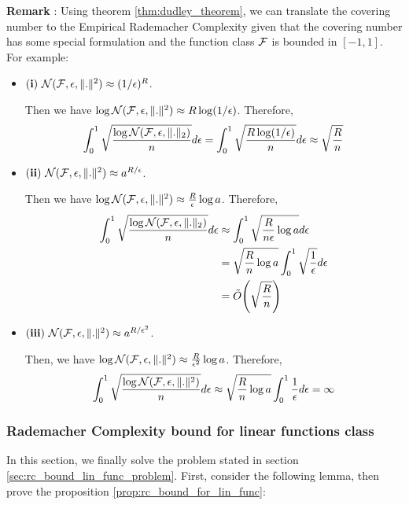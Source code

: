\noindent\newline\textbf{Remark} : Using theorem \ref{thm:dudley_theorem}, we can translate the covering number to the Empirical Rademacher Complexity given that the covering number has some special formulation and the function class $\mathcal{F}$ is bounded in $[-1, 1]$. For example:
\begin{itemize}
    \item ${\bf (i)} \ \mathcal{N}(\mathcal{F}, \epsilon, \|.\|^2) \approx (1/\epsilon)^R$.

    \noindent Then we have $\log\mathcal{N}(\mathcal{F}, \epsilon, \|.\|^2) \approx R\log(1/\epsilon)$. Therefore,
    \begin{align*}
        \int_0^1 \sqrt{
            \frac{\log \mathcal{N}(\mathcal{F}, \epsilon, \|.\|_2)}{n}
        }d\epsilon = \int_0^1\sqrt{
            \frac{R\log(1/\epsilon)}{n}
        }d\epsilon \approx \sqrt{\frac{R}{n}}
    \end{align*}

    \item ${\bf (ii)} \ \mathcal{N}(\mathcal{F}, \epsilon, \|.\|^2) \approx a^{R/\epsilon}$.

    \noindent Then we have $\log\mathcal{N}(\mathcal{F}, \epsilon, \|.\|^2) \approx \frac{R}{\epsilon}\log a$. Therefore,
    \begin{align*}
        \int_0^1 \sqrt{
            \frac{\log \mathcal{N}(\mathcal{F}, \epsilon, \|.\|_2)}{n}
        }d\epsilon &\approx \int_0^1\sqrt{
            \frac{R}{n\epsilon}\log a 
        }d\epsilon \\
        &= \sqrt{
            \frac{R}{n}\log a 
        }\int_0^1 \sqrt{\frac{1}{\epsilon}}d\epsilon \\
        &= \tilde O\Bigg(  \sqrt{\frac{R}{n}}  \Bigg)
    \end{align*}

    \item ${\bf (iii)} \ \mathcal{N}(\mathcal{F}, \epsilon, \|.\|^2) \approx a^{R/\epsilon^2}$.
    
    \noindent Then, we have $\log \mathcal{N}(\mathcal{F}, \epsilon, \|.\|^2)\approx \frac{R}{\epsilon^2}\log a$. Therefore,
    \begin{align*}
        \int_0^1 \sqrt{
            \frac{\log \mathcal{N}(\mathcal{F}, \epsilon, \|.\|^2)}{n}
        }d\epsilon \approx \sqrt{
            \frac{R}{n}\log a 
        }\int_0^1 \frac{1}{\epsilon}d\epsilon = \infty
    \end{align*}
\end{itemize}

\subsubsection{Rademacher Complexity bound for linear functions class}
In this section, we finally solve the problem stated in section \ref{sec:rc_bound_lin_func_problem}. First, consider the following lemma, then prove the proposition \ref{prop:rc_bound_for_lin_func}:

